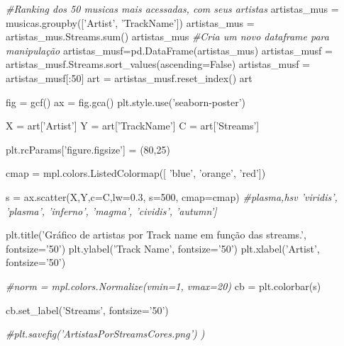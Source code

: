\documentclass[11pt]{article}
\newenvironment{Shaded}{}{}
\newcommand{\DecValTok}[1]{\textcolor[rgb]{0.25,0.63,0.44}{{#1}}}
\newcommand{\FloatTok}[1]{\textcolor[rgb]{0.25,0.63,0.44}{{#1}}}
\newcommand{\StringTok}[1]{\textcolor[rgb]{0.25,0.44,0.63}{{#1}}}
\newcommand{\CommentTok}[1]{\textcolor[rgb]{0.38,0.63,0.69}{\textit{{#1}}}}
\newcommand{\NormalTok}[1]{{#1}}
\newcommand{\VariableTok}[1]{\textcolor[rgb]{0.10,0.09,0.49}{{#1}}}
\newcommand{\OperatorTok}[1]{\textcolor[rgb]{0.40,0.40,0.40}{{#1}}}
\newcommand{\BuiltInTok}[1]{{#1}}
\begin{document}
\begin{Shaded}
\begin{Highlighting}[]

    \CommentTok{#Ranking dos 50 musicas mais acessadas, com seus artistas}
\NormalTok{    artistas_mus }\OperatorTok{=}\NormalTok{ musicas.groupby([}\StringTok{'Artist'}\NormalTok{, }\StringTok{'TrackName'}\NormalTok{])}
\NormalTok{    artistas_mus }\OperatorTok{=}\NormalTok{ artistas_mus.Streams.}\BuiltInTok{sum}\NormalTok{()}
\NormalTok{    artistas_mus}
    \CommentTok{#Cria um novo dataframe para manipulação}
\NormalTok{    artistas_musf}\OperatorTok{=}\NormalTok{pd.DataFrame(artistas_mus)}
\NormalTok{    artistas_musf }\OperatorTok{=}\NormalTok{ artistas_musf.Streams.sort_values(ascending}\OperatorTok{=}\VariableTok{False}\NormalTok{)}
\NormalTok{    artistas_musf }\OperatorTok{=}\NormalTok{ artistas_musf[:}\DecValTok{50}\NormalTok{]}
\NormalTok{    art }\OperatorTok{=}\NormalTok{ artistas_musf.reset_index()}
\NormalTok{    art}

\NormalTok{    fig }\OperatorTok{=}\NormalTok{ gcf()}
\NormalTok{    ax }\OperatorTok{=}\NormalTok{ fig.gca()}
\NormalTok{    plt.style.use(}\StringTok{'seaborn-poster'}\NormalTok{)}

\NormalTok{    X }\OperatorTok{=}\NormalTok{ art[}\StringTok{'Artist'}\NormalTok{]}
\NormalTok{    Y }\OperatorTok{=}\NormalTok{ art[}\StringTok{'TrackName'}\NormalTok{]}
\NormalTok{    C }\OperatorTok{=}\NormalTok{ art[}\StringTok{'Streams'}\NormalTok{]}

\NormalTok{    plt.rcParams[}\StringTok{'figure.figsize'}\NormalTok{] }\OperatorTok{=}\NormalTok{ (}\DecValTok{80}\NormalTok{,}\DecValTok{25}\NormalTok{)}

\NormalTok{    cmap }\OperatorTok{=}\NormalTok{ mpl.colors.ListedColormap([ }\StringTok{'blue'}\NormalTok{, }\StringTok{'orange'}\NormalTok{,  }\StringTok{'red'}\NormalTok{])}


\NormalTok{    s }\OperatorTok{=}\NormalTok{ ax.scatter(X,Y,c}\OperatorTok{=}\NormalTok{C,lw}\OperatorTok{=}\FloatTok{0.3}\NormalTok{, s}\OperatorTok{=}\DecValTok{500}\NormalTok{, cmap}\OperatorTok{=}\NormalTok{cmap) }\CommentTok{#plasma,hsv  'viridis', 'plasma', 'inferno', 'magma', 'cividis', 'autumn']}

\NormalTok{    plt.title(}\StringTok{'Gráfico de artistas por Track name em função das streams.'}\NormalTok{, fontsize}\OperatorTok{=}\StringTok{'50'}\NormalTok{)}
\NormalTok{    plt.ylabel(}\StringTok{'Track Name'}\NormalTok{, fontsize}\OperatorTok{=}\StringTok{'50'}\NormalTok{)}
\NormalTok{    plt.xlabel(}\StringTok{'Artist'}\NormalTok{, fontsize}\OperatorTok{=}\StringTok{'50'}\NormalTok{)}


    \CommentTok{#norm = mpl.colors.Normalize(vmin=1, vmax=20)}
\NormalTok{    cb }\OperatorTok{=}\NormalTok{ plt.colorbar(s)}

\NormalTok{    cb.set_label(}\StringTok{'Streams'}\NormalTok{, fontsize}\OperatorTok{=}\StringTok{'50'}\NormalTok{)}


    \CommentTok{#plt.savefig('ArtistasPorStreamsCores.png') )  }
\end{Highlighting}
\end{Shaded}
\end{document}
